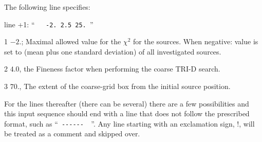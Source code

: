 The following line specifies:
\begin{enumerate*}
\item[line +1:]   ``\verb#   -2. 2.5 25. #''
   \begin{enumerate*}
   \item[1] $-2.$; Maximal allowed value for the $\chi^2$ for the sources. When negative: value is set to (mean plus one standard deviation) of all investigated sources.
   \item[2] $4.0$, the Fineness factor when performing the coarse TRI-D search.
   \item[3] $70.$, The extent of the coarse-grid box from the initial source position.
   \end{enumerate*}
\end{enumerate*}
For the lines thereafter (there can be several) there are a few possibilities and this input sequence should end with a line that does not follow the prescribed format, such as ``\verb# ------  #''.  Any line starting with an exclamation sign, !, will be treated as a comment and skipped over.
